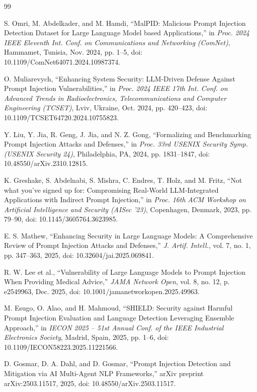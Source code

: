 \documentclass[12pt, letterpaper]{article}   %
\begin{document}
\begin{thebibliography}{99}
\setlength{\itemsep}{0pt}
\setlength{\parsep}{0pt}
\setlength{\parskip}{0pt}

S. Omri, M. Abdelkader, and M. Hamdi, ``MalPID: Malicious Prompt Injection Detection Dataset for Large Language Model based Applications,'' in \textit{Proc. 2024 IEEE Eleventh Int. Conf. on Communications and Networking (ComNet)}, Hammamet, Tunisia, Nov. 2024, pp. 1--5, doi: 10.1109/ComNet64071.2024.10987374.

O. Muliarevych, ``Enhancing System Security: LLM-Driven Defense Against Prompt Injection Vulnerabilities,'' in \textit{Proc. 2024 IEEE 17th Int. Conf. on Advanced Trends in Radioelectronics, Telecommunications and Computer Engineering (TCSET)}, Lviv, Ukraine, Oct. 2024, pp. 420--423, doi: 10.1109/TCSET64720.2024.10755823.

Y. Liu, Y. Jia, R. Geng, J. Jia, and N. Z. Gong, ``Formalizing and Benchmarking Prompt Injection Attacks and Defenses,'' in \textit{Proc. 33rd USENIX Security Symp. (USENIX Security 24)}, Philadelphia, PA, 2024, pp. 1831--1847, doi: 10.48550/arXiv.2310.12815.

K. Greshake, S. Abdelnabi, S. Mishra, C. Endres, T. Holz, and M. Fritz, ``Not what you've signed up for: Compromising Real-World LLM-Integrated Applications with Indirect Prompt Injection,'' in \textit{Proc. 16th ACM Workshop on Artificial Intelligence and Security (AISec '23)}, Copenhagen, Denmark, 2023, pp. 79--90, doi: 10.1145/3605764.3623985.

E. S. Mathew, ``Enhancing Security in Large Language Models: A Comprehensive Review of Prompt Injection Attacks and Defenses,'' \textit{J. Artif. Intell.}, vol. 7, no. 1, pp. 347--363, 2025, doi: 10.32604/jai.2025.069841.

R. W. Lee et al., ``Vulnerability of Large Language Models to Prompt Injection When Providing Medical Advice,'' \textit{JAMA Network Open}, vol. 8, no. 12, p. e2549963, Dec. 2025, doi: 10.1001/jamanetworkopen.2025.49963.

M. Esugo, O. Alao, and H. Mahmoud, ``SHIELD: Security against Harmful Prompt Injection Evaluation and Language Detection Leveraging Ensemble Approach,'' in \textit{IECON 2025 -- 51st Annual Conf. of the IEEE Industrial Electronics Society}, Madrid, Spain, 2025, pp. 1--6, doi: 10.1109/IECON58223.2025.11221566.

D. Gosmar, D. A. Dahl, and D. Gosmar, ``Prompt Injection Detection and Mitigation via AI Multi-Agent NLP Frameworks,'' arXiv preprint arXiv:2503.11517, 2025, doi: 10.48550/arXiv.2503.11517.


\end{thebibliography}
\end{document}
